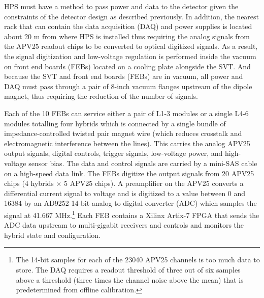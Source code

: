 HPS must have a method to pass power and data to the detector given the constraints of the detector design as described previously. In addition, the nearest rack that can contain the data acquisition (DAQ) and power supplies is located about 20 m from where HPS is installed thus requiring the analog signals from the APV25 readout chips to be converted to optical digitized signals. As a result, the signal digitization and low-voltage regulation is performed inside the vacuum on front end boards (FEBs) located on a cooling plate alongside the SVT. And because the SVT and front end boards (FEBs) are in vacuum, all power and DAQ must pass through a pair of 8-inch vacuum flanges upstream of the dipole magnet, thus requiring the reduction of the number of signals.

Each of the 10 FEBs can service either a pair of L1-3 modules or a single L4-6 modules totalling four hybrids which is connected by a single bundle of impedance-controlled twisted pair magnet wire (which reduces crosstalk and electromagnetic interference between the lines). This carries the analog APV25 output signals, digital controls, trigger signals, low-voltage power, and high-voltage sensor bias. The data and control signals are carried by a mini-SAS cable on a high-speed data link. The FEBs digitize the output signals from 20 APV25 chips (4 hybrids $\times$ 5 APV25 chips). A preamplifier on the APV25 converts a differential current signal to voltage and is digitized to a value between 0 and 16384 by an AD9252 14-bit analog to digital converter (ADC) which samples the signal at 41.667 MHz.\footnote{The 14-bit samples for each of the 23040 APV25 channels is too much data to store. The DAQ requires a readout threshold of three out of six samples above a threshold (three times the channel noise above the mean) that is predetermined from offline calibration.} Each FEB contains a Xilinx Artix-7 FPGA that sends the ADC data upstream to multi-gigabit receivers and controls and monitors the hybrid state and configuration.


